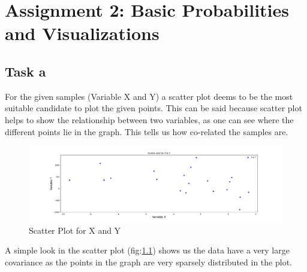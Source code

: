 \chapter{Assignment 2: Basic Probabilities and Visualizations}

\section{Task a}
For the given samples (Variable X and Y) a scatter plot deems to be the most suitable candidate to plot the given points. This can be said because scatter plot helps to show the relationship between two variables, as one can see where the different points lie in the graph. This tells us how co-related the samples are.

\begin{figure}[h!]
\centering
\includegraphics[width=\textwidth]{pics/task_2_a.pdf}
\caption{Scatter Plot for X and Y}\label{fig:task_2_a}
\end{figure}
\FloatBarrier
\newline 
A simple look in the scatter plot (fig:\ref{fig:task_2_a}) shows us the data have a very large covariance as the points in the graph are very sparsely distributed in the plot.

